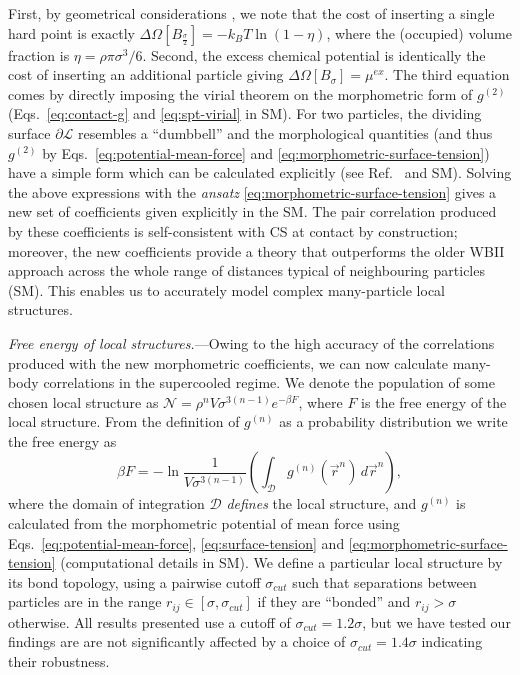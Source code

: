 \documentclass[11pt,twoside]{report}
\begin{document}
First, by geometrical considerations \cite{Reiss1959}, we note that the cost of inserting a single hard point is exactly $\Delta \Omega[B_{\frac{\sigma}{2}}] = -k_B T \ln{(1- \eta)}$, where the (occupied) volume fraction is $\eta = \rho \pi \sigma^3 / 6$.
Second, the excess chemical potential is identically the cost of inserting an additional particle giving \cite{Widom1963} $\Delta \Omega[B_{\sigma}] = \mu^{ex}.$
The third equation comes by directly imposing the virial theorem \cite{Hansen2013} on the morphometric form of $g^{(2)}$ (Eqs.\ \ref{eq:contact-g} and \eqref{eq:spt-virial} in SM).
For two particles, the dividing surface $\partial\mathcal{L}$ resembles a ``dumbbell'' and the morphological quantities (and thus $g^{(2)}$ by Eqs.\ \eqref{eq:potential-mean-force} and \eqref{eq:morphometric-surface-tension}) have a simple form which can be calculated explicitly (see Ref.\ \cite{Oettel2009} and SM).
Solving the above expressions with the \emph{ansatz} \eqref{eq:morphometric-surface-tension} gives a new set of coefficients given explicitly in the SM.
The pair correlation produced by these coefficients is self-consistent with CS at contact by construction; moreover, the new coefficients provide a theory that outperforms the older WBII approach across the whole range of distances typical of neighbouring particles (SM).
This enables us to accurately model complex many-particle local structures.

\emph{Free energy of local structures.}---Owing to the high accuracy of the correlations produced with the new morphometric coefficients, we can now calculate many-body correlations in the supercooled regime.
We denote the population of some chosen local structure as $\mathcal{N} = \rho^n V \sigma^{3(n-1)} e^{-\beta F}$, where $F$ is the free energy of the local structure.
From the definition of $g^{(n)}$ as a probability distribution we write the free energy as
\begin{equation}\label{eq:local-structure-free-energy}
  \beta F = -\ln{
    \frac{1}{V \sigma^{3(n-1)}}
    \left(
    \int_{\mathcal{D}}
    g^{(n)}(\vec{r}^n) \, d\vec{r}^n
    \right)
  },
\end{equation}
where the domain of integration $\mathcal{D}$ \emph{defines} the local structure, and $g^{(n)}$ is calculated from the morphometric potential of mean force using Eqs.\ \eqref{eq:potential-mean-force}, \eqref{eq:surface-tension} and \eqref{eq:morphometric-surface-tension} (computational details in SM).
We define a particular local structure by its bond topology, using a pairwise cutoff $\sigma_{cut}$ such that separations between particles are in the range $r_{ij} \in [\sigma, \sigma_{cut}]$ if they are ``bonded'' and $r_{ij} > \sigma$ otherwise.
All results presented use a cutoff of $\sigma_{cut}=1.2 \sigma$, but we have tested our findings are are not significantly affected by a choice of $\sigma_{cut}=1.4 \sigma$ indicating their robustness.
\end{document}
